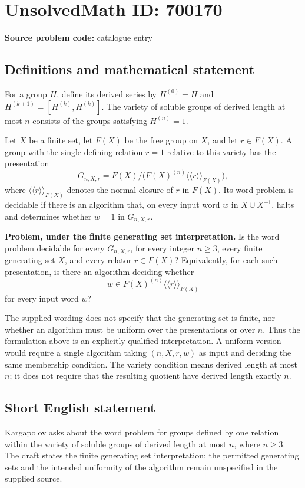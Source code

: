 \documentclass[11pt]{article}
\begin{document}
\section*{UnsolvedMath ID: 700170}
\textbf{Source problem code:} catalogue entry
\subsection{Definitions and mathematical statement}
For a group \(H\), define its derived series by \(H^{(0)}=H\) and \(H^{(k+1)}=[H^{(k)},H^{(k)}]\). The variety of soluble groups of derived length at most \(n\) consists of the groups satisfying \(H^{(n)}=1\).

Let \(X\) be a finite set, let \(F(X)\) be the free group on \(X\), and let \(r\in F(X)\). A group with the single defining relation \(r=1\) relative to this variety has the presentation
\[
G_{n,X,r}=F(X)\big/\bigl(F(X)^{(n)}\langle\!\langle r\rangle\!\rangle_{F(X)}\bigr),
\]
where \(\langle\!\langle r\rangle\!\rangle_{F(X)}\) denotes the normal closure of \(r\) in \(F(X)\). Its word problem is decidable if there is an algorithm that, on every input word \(w\) in \(X\cup X^{-1}\), halts and determines whether \(w=1\) in \(G_{n,X,r}\).

\textbf{Problem, under the finite generating set interpretation.} Is the word problem decidable for every \(G_{n,X,r}\), for every integer \(n\geq 3\), every finite generating set \(X\), and every relator \(r\in F(X)\)? Equivalently, for each such presentation, is there an algorithm deciding whether
\[
w\in F(X)^{(n)}\langle\!\langle r\rangle\!\rangle_{F(X)}
\]
for every input word \(w\)?

The supplied wording does not specify that the generating set is finite, nor whether an algorithm must be uniform over the presentations or over \(n\). Thus the formulation above is an explicitly qualified interpretation. A uniform version would require a single algorithm taking \((n,X,r,w)\) as input and deciding the same membership condition. The variety condition means derived length at most \(n\); it does not require that the resulting quotient have derived length exactly \(n\).
\subsection{Short English statement}
Kargapolov asks about the word problem for groups defined by one relation within the variety of soluble groups of derived length at most \(n\), where \(n\geq 3\). The draft states the finite generating set interpretation; the permitted generating sets and the intended uniformity of the algorithm remain unspecified in the supplied source.
\end{document}
